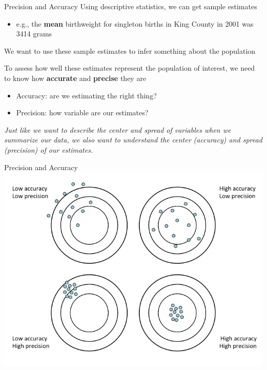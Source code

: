 \documentclass[10pt,t]{beamer}
\begin{document}
\begin{frame}{Precision and Accuracy}
Using descriptive statistics, we can get sample estimates
\vspace{0.3cm}
\begin{itemize}
	\item e.g., the \textbf{mean} birthweight for singleton births in King County in 2001 was 3414 grams
\end{itemize}
\vspace{0.3cm}
We want to use these sample estimates to infer something about the population 
\vspace{0.3cm}

To assess how well these estimates represent the population of interest, we need to know how \textbf{accurate} and \textbf{precise} they are

\vspace{0.3cm}
\begin{itemize}
	\item Accuracy: are we estimating the right thing?
	\item Precision: how variable are our estimates?
\end{itemize}
\vspace{0.3cm}
\textit{Just like we want to describe the center and spread of variables when we summarize our data, we also want to understand the center (accuracy) and spread (precision) of our estimates.}
\end{frame}

\begin{frame}[c]{Precision and Accuracy}
\centering \includegraphics[scale=0.38]{accuracy.jpg}
\end{frame}
\end{document}

